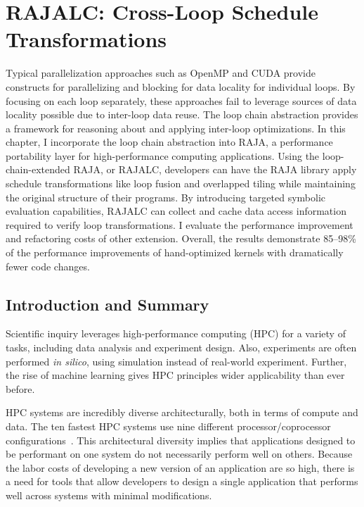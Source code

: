 \chapter{RAJALC: Cross-Loop Schedule Transformations}\label{chap:RAJALC}

Typical parallelization approaches such as OpenMP and CUDA provide constructs for parallelizing and blocking for data locality for individual loops.
By focusing on each loop separately, these approaches fail to leverage sources of data locality possible due to inter-loop data reuse.
The loop chain abstraction provides a framework for reasoning about and applying inter-loop optimizations.
In this chapter, I incorporate the loop chain abstraction into RAJA, a performance portability layer for high-performance computing applications.
Using the loop-chain-extended RAJA, or RAJALC, developers can have the RAJA library apply schedule transformations like loop fusion and overlapped tiling while maintaining the original structure of their programs. 
By introducing targeted symbolic evaluation capabilities, RAJALC can collect and cache data access information required to verify loop transformations.
I evaluate the performance improvement and refactoring costs of other extension.
Overall, the results demonstrate 85--98\% of the performance improvements of hand-optimized kernels with dramatically fewer code changes.

\section{Introduction and Summary}
Scientific inquiry leverages high-performance computing (HPC) for a variety of
tasks, including data analysis and experiment design. 
Also, experiments are often performed \textit{in silico}, using 
simulation instead of real-world experiment.
Further, the rise of machine learning gives HPC principles wider
applicability than ever before.

HPC systems are incredibly diverse architecturally, 
both in terms of compute and data.
The ten fastest HPC systems use nine different processor/coprocessor
configurations~\cite{top500}.
This architectural diversity implies that applications designed to be
performant on one system do not necessarily perform well on others.
Because the labor costs of developing a new version of an application are so high, 
there is a need for tools that allow developers to design a single application
that performs well across systems with minimal modifications.

